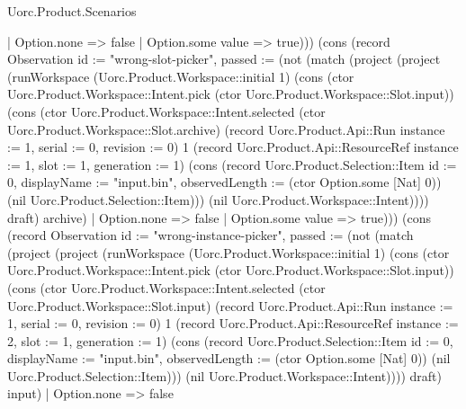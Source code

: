 \begin{lexlean}{Uorc.Product.Scenarios}
\begin{semanticmodule}
{{    | Option.none => false
    | Option.some value => true))}) (cons (record Observation {id := "wrong-slot-picker", passed := (not (match (project (project (runWorkspace (Uorc.Product.Workspace::initial 1) (cons (ctor Uorc.Product.Workspace::Intent.pick (ctor Uorc.Product.Workspace::Slot.input)) (cons (ctor Uorc.Product.Workspace::Intent.selected (ctor Uorc.Product.Workspace::Slot.archive) (record Uorc.Product.Api::Run {instance := 1, serial := 0, revision := 0}) 1 (record Uorc.Product.Api::ResourceRef {instance := 1, slot := 1, generation := 1}) (cons (record Uorc.Product.Selection::Item {id := 0, displayName := "input.bin", observedLength := (ctor Option.some [Nat] 0)}) (nil Uorc.Product.Selection::Item))) (nil Uorc.Product.Workspace::Intent)))) draft) archive)
    | Option.none => false
    | Option.some value => true))}) (cons (record Observation {id := "wrong-instance-picker", passed := (not (match (project (project (runWorkspace (Uorc.Product.Workspace::initial 1) (cons (ctor Uorc.Product.Workspace::Intent.pick (ctor Uorc.Product.Workspace::Slot.input)) (cons (ctor Uorc.Product.Workspace::Intent.selected (ctor Uorc.Product.Workspace::Slot.input) (record Uorc.Product.Api::Run {instance := 1, serial := 0, revision := 0}) 1 (record Uorc.Product.Api::ResourceRef {instance := 2, slot := 1, generation := 1}) (cons (record Uorc.Product.Selection::Item {id := 0, displayName := "input.bin", observedLength := (ctor Option.some [Nat] 0)}) (nil Uorc.Product.Selection::Item))) (nil Uorc.Product.Workspace::Intent)))) draft) input)
    | Option.none => false
}}
\end{semanticmodule}
\end{lexlean}
